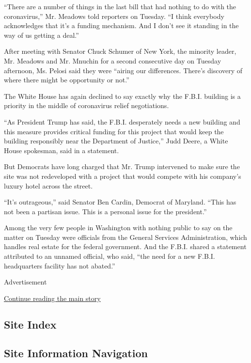 ``There are a number of things in the last bill that had nothing to do
with the coronavirus,'' Mr. Meadows told reporters on Tuesday. ``I think
everybody acknowledges that it's a funding mechanism. And I don't see it
standing in the way of us getting a deal.''

After meeting with Senator Chuck Schumer of New York, the minority
leader, Mr. Meadows and Mr. Mnuchin for a second consecutive day on
Tuesday afternoon, Ms. Pelosi said they were ``airing our differences.
There's discovery of where there might be opportunity or not.''

The White House has again declined to say exactly why the F.B.I.
building is a priority in the middle of coronavirus relief negotiations.

``As President Trump has said, the F.B.I. desperately needs a new
building and this measure provides critical funding for this project
that would keep the building responsibly near the Department of
Justice,'' Judd Deere, a White House spokesman, said in a statement.

But Democrats have long charged that Mr. Trump intervened to make sure
the site was not redeveloped with a project that would compete with his
company's luxury hotel across the street.

``It's outrageous,'' said Senator Ben Cardin, Democrat of Maryland.
``This has not been a partisan issue. This is a personal issue for the
president.''

Among the very few people in Washington with nothing public to say on
the matter on Tuesday were officials from the General Services
Administration, which handles real estate for the federal government.
And the F.B.I. shared a statement attributed to an unnamed official, who
said, ``the need for a new F.B.I. headquarters facility has not
abated.''

Advertisement

\protect\hyperlink{after-bottom}{Continue reading the main story}

\hypertarget{site-index}{%
\subsection{Site Index}\label{site-index}}

\hypertarget{site-information-navigation}{%
\subsection{Site Information
Navigation}\label{site-information-navigation}}

